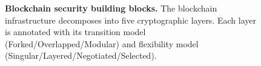 \begin{figure}[!t]
\caption{\textbf{Blockchain security building blocks.} 
The blockchain infrastructure decomposes into five cryptographic layers. 
Each layer is annotated with its transition model (Forked/Overlapped/Modular) and flexibility model (Singular/Layered/Negotiated/Selected).}
\label{fig:blockchain-layers}
\end{figure}

